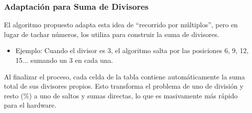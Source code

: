 \subsubsection{Adaptación para Suma de Divisores}
El algoritmo propuesto adapta esta idea de ``recorrido por múltiplos'', pero en lugar de tachar números, los utiliza para construir la suma de divisores.

\begin{itemize}
	\item Ejemplo: Cuando el divisor es 3, el algoritmo salta por las posiciones 6, 9, 12, 15... sumando un 3 en cada una.
\end{itemize}

Al finalizar el proceso, cada celda de la tabla contiene automáticamente la suma total de sus divisores propios. Esto transforma el problema de uno de división y resto (\%) a uno de saltos y sumas directas, lo que es masivamente más rápido para el hardware.
